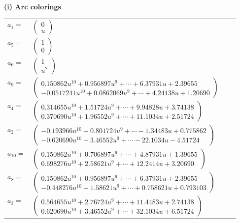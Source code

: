\documentclass[1p]{elsarticle_modified}
\theoremstyle{definition}
\begin{document}
\flushleft \textbf{(i) Arc colorings}\\
\begin{tabular}{m{7pt} m{180pt} m{7pt} m{180pt} }
\flushright $a_{1}=$&$\begin{pmatrix}0\\u\end{pmatrix}$ \\
\flushright $a_{5}=$&$\begin{pmatrix}1\\0\end{pmatrix}$ \\
\flushright $a_{6}=$&$\begin{pmatrix}1\\u^2\end{pmatrix}$ \\
\flushright $a_{9}=$&$\begin{pmatrix}0.150862 u^{10}+0.956897 u^{9}+\cdots+6.37931 u+2.39655\\-0.0517241 u^{10}+0.0862069 u^{9}+\cdots+4.24138 u+1.20690\end{pmatrix}$ \\
\flushright $a_{4}=$&$\begin{pmatrix}0.314655 u^{10}+1.51724 u^{9}+\cdots+9.94828 u+3.74138\\0.370690 u^{10}+1.96552 u^{9}+\cdots+11.1034 u+2.51724\end{pmatrix}$ \\
\flushright $a_{2}=$&$\begin{pmatrix}-0.193966 u^{10}-0.801724 u^{9}+\cdots-1.34483 u+0.775862\\-0.620690 u^{10}-3.46552 u^{9}+\cdots-22.1034 u-4.51724\end{pmatrix}$ \\
\flushright $a_{10}=$&$\begin{pmatrix}0.150862 u^{10}+0.706897 u^{9}+\cdots+4.87931 u+1.39655\\0.698276 u^{10}+2.58621 u^{9}+\cdots+12.2414 u+3.20690\end{pmatrix}$ \\
\flushright $a_{8}=$&$\begin{pmatrix}0.150862 u^{10}+0.956897 u^{9}+\cdots+6.37931 u+2.39655\\-0.448276 u^{10}-1.58621 u^{9}+\cdots+0.758621 u+0.793103\end{pmatrix}$ \\
\flushright $a_{3}=$&$\begin{pmatrix}0.564655 u^{10}+2.76724 u^{9}+\cdots+11.4483 u+2.74138\\0.620690 u^{10}+3.46552 u^{9}+\cdots+32.1034 u+6.51724\end{pmatrix}$ \\

\end{tabular}
\end{document}
